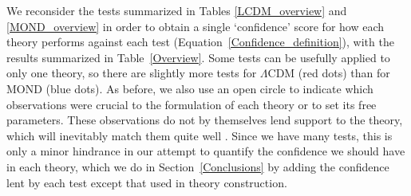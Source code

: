 \documentclass[fleqn,usenatbib,useAMS]{mnras} %
\begin{document}
We reconsider the tests summarized in Tables \ref{LCDM_overview} and \ref{MOND_overview} in order to obtain a single `confidence' score for how each theory performs against each test (Equation~\ref{Confidence_definition}), with the results summarized in Table~\ref{Overview}. Some tests can be usefully applied to only one theory, so there are slightly more tests for $\Lambda$CDM (red dots) than for MOND (blue dots). As before, we also use an open circle to indicate which observations were crucial to the formulation of each theory or to set its free parameters. These observations do not by themselves lend support to the theory, which will inevitably match them quite well \citep{Merritt_2020}. Since we have many tests, this is only a minor hindrance in our attempt to quantify the confidence we should have in each theory, which we do in Section~\ref{Conclusions} by adding the confidence lent by each test except that used in theory construction.
\end{document}
